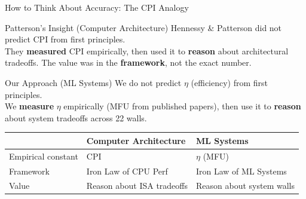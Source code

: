 \begin{frame}{How to Think About Accuracy: The CPI Analogy}
\begin{block}{Patterson's Insight (Computer Architecture)}
\small
Hennessy \& Patterson did not predict CPI from first principles.\\
They \textbf{measured} CPI empirically, then used it to \textbf{reason} about
architectural tradeoffs. The value was in the \textbf{framework}, not the exact number.
\end{block}

\vspace{0.5em}
\begin{block}{Our Approach (ML Systems)}
\small
We do not predict $\eta$ (efficiency) from first principles.\\
We \textbf{measure} $\eta$ empirically (MFU from published papers), then use it
to \textbf{reason} about system tradeoffs across 22 walls.
\end{block}

\vspace{0.8em}
\centering
\begin{tabular}{@{}lll@{}}
\toprule
& \textbf{Computer Architecture} & \textbf{ML Systems} \\
\midrule
Empirical constant & CPI & $\eta$ (MFU) \\
Framework & Iron Law of CPU Perf & Iron Law of ML Systems \\
Value & Reason about ISA tradeoffs & Reason about system walls \\
\bottomrule
\end{tabular}
\end{frame}

